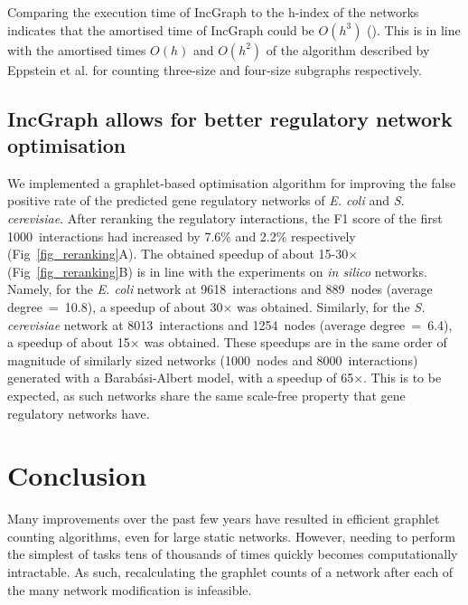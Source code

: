 Comparing the execution time of IncGraph to the h-index of the networks indicates that the amortised time of IncGraph could be $O(h^3)$ (). This is in line with the amortised times $O(h)$ and $O(h^2)$ of the algorithm described by Eppstein et al.\cite{Eppstein2012} for counting three-size and four-size subgraphs respectively.

\subsection*{IncGraph allows for better regulatory network optimisation}
We implemented a graphlet-based optimisation algorithm for improving the false positive rate of the predicted gene regulatory networks of \textit{E. coli} and \textit{S. cerevisiae}. After reranking the regulatory interactions, the F1 score of the first 1000~interactions had increased by 7.6\% and 2.2\% respectively (Fig~\ref{fig_reranking}A). The obtained speedup of about 15-30$\times$ (Fig~\ref{fig_reranking}B) is in line with the experiments on \textit{in silico} networks.
Namely, for the \textit{E. coli} network at 9618~interactions and 889~nodes (average degree~=~10.8), a speedup of about 30$\times$ was obtained.
Similarly, for the \textit{S. cerevisiae} network at 8013~interactions and 1254~nodes (average degree~=~6.4), a speedup of about 15$\times$ was obtained.
These speedups are in the same order of magnitude of similarly sized networks (1000~nodes and 8000~interactions) generated with a Barab\'asi-Albert model, with a speedup of 65$\times$. This is to be expected, as such networks share the same scale-free property that gene regulatory networks have.



\section*{Conclusion}
Many improvements over the past few years have resulted in efficient graphlet counting algorithms, even for large static networks. However, needing to perform the simplest of tasks tens of thousands of times quickly becomes computationally intractable. As such, recalculating the graphlet counts of a network after each of the many network modification is infeasible.

